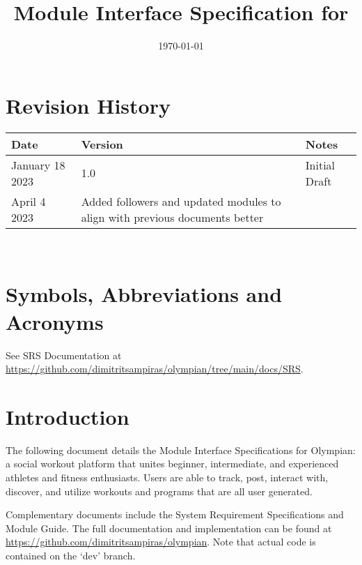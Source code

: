 \documentclass[12pt, titlepage]{article}
\begin{document}
\title{Module Interface Specification for \progname{}}

\author{\authname}

\date{\today}

\maketitle


\section{Revision History}

\begin{tabularx}{\textwidth}{p{3cm}p{2cm}X}
\toprule {\bf Date} & {\bf Version} & {\bf Notes}\\
\midrule
January 18 2023 & 1.0 & Initial Draft\\
April 4 2023 & Added followers and updated modules to align with previous documents better \\
\bottomrule
\end{tabularx}

~\newpage

\section{Symbols, Abbreviations and Acronyms}

See SRS Documentation at \url{https://github.com/dimitritsampiras/olympian/tree/main/docs/SRS}.

\newpage

\tableofcontents

\newpage


\section{Introduction}

The following document details the Module Interface Specifications for Olympian: a social workout platform that unites beginner, intermediate, and experienced athletes and fitness enthusiasts. Users are able to track, post, interact with, discover, and utilize workouts and programs that are all user generated.

Complementary documents include the System Requirement Specifications
and Module Guide.  The full documentation and implementation can be
found at \url{https://github.com/dimitritsampiras/olympian}.
Note that actual code is contained on the `dev' branch.
\end{document}
